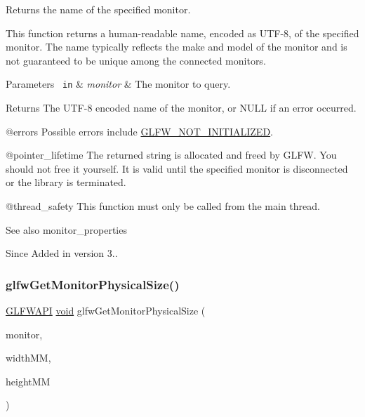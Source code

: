 Returns the name of the specified monitor. 

This function returns a human-\/readable name, encoded as U\+T\+F-\/8, of the specified monitor. The name typically reflects the make and model of the monitor and is not guaranteed to be unique among the connected monitors.


\begin{DoxyParams}[1]{Parameters}
\mbox{\texttt{ in}}  & {\em monitor} & The monitor to query. \\
\hline
\end{DoxyParams}
\begin{DoxyReturn}{Returns}
The U\+T\+F-\/8 encoded name of the monitor, or {\ttfamily N\+U\+LL} if an error occurred.
\end{DoxyReturn}
@errors Possible errors include \mbox{\hyperlink{group__errors_ga2374ee02c177f12e1fa76ff3ed15e14a}{G\+L\+F\+W\+\_\+\+N\+O\+T\+\_\+\+I\+N\+I\+T\+I\+A\+L\+I\+Z\+ED}}.

@pointer\+\_\+lifetime The returned string is allocated and freed by G\+L\+FW. You should not free it yourself. It is valid until the specified monitor is disconnected or the library is terminated.

@thread\+\_\+safety This function must only be called from the main thread.

\begin{DoxySeeAlso}{See also}
monitor\+\_\+properties
\end{DoxySeeAlso}
\begin{DoxySince}{Since}
Added in version 3.. 
\end{DoxySince}
\mbox{\label{group__monitor_gad0e93a9e42b32394369cabbbdc1ab702}} 
\subsubsection{\texorpdfstring{glfwGetMonitorPhysicalSize()}{glfwGetMonitorPhysicalSize()}}
{\footnotesize\ttfamily \mbox{\hyperlink{glfw3_8h_a56da5036b2cc259351ae22fd6439bb47}{G\+L\+F\+W\+A\+PI}} \mbox{\hyperlink{glad_8h_a950fc91edb4504f62f1c577bf4727c29}{void}} glfw\+Get\+Monitor\+Physical\+Size (\begin{DoxyParamCaption}\item[{\mbox{\hyperlink{group__monitor_ga8d9efd1cde9426692c73fe40437d0ae3}{G\+L\+F\+Wmonitor}} $\ast$}]{monitor,  }\item[{int $\ast$}]{width\+MM,  }\item[{int $\ast$}]{height\+MM }\end{DoxyParamCaption})}



